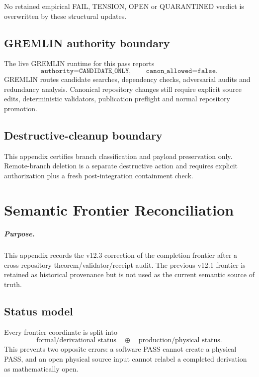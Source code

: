 \documentclass[11pt,a4paper,twoside]{book}
\theoremstyle{definition}
\begin{document}
No retained empirical FAIL, TENSION, OPEN or QUARANTINED verdict is overwritten
by these structural updates.

\section{GREMLIN authority boundary}

The live GREMLIN runtime for this pass reports
\[
\boxed{
\texttt{authority=CANDIDATE\_ONLY},
\qquad
\texttt{canon\_allowed=false}.
}
\]
GREMLIN routes candidate searches, dependency checks, adversarial audits and
redundancy analysis.  Canonical repository changes still require explicit
source edits, deterministic validators, publication preflight and normal
repository promotion.

\section{Destructive-cleanup boundary}

This appendix certifies branch classification and payload preservation only.
Remote-branch deletion is a separate destructive action and requires explicit
authorization plus a fresh post-integration containment check.

\clearpage

\chapter{Semantic Frontier Reconciliation}
\label{app:v12_semantic_frontier_reconciliation}

\paragraph{Purpose.}
This appendix records the v12.3 correction of the completion frontier after a
cross-repository theorem/validator/receipt audit. The previous v12.1 frontier
is retained as historical provenance but is not used as the current semantic
source of truth.

\section{Status model}

Every frontier coordinate is split into
\[
\boxed{
\text{formal/derivational status}
\quad\oplus\quad
\text{production/physical status}.
}
\]
This prevents two opposite errors: a software PASS cannot create a physical
PASS, and an open physical source input cannot relabel a completed derivation
as mathematically open.
\end{document}
